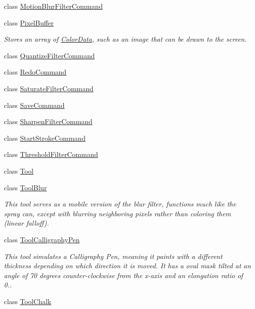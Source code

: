 \begin{DoxyCompactItemize}
class \hyperlink{classimage__tools_1_1MotionBlurFilterCommand}{Motion\+Blur\+Filter\+Command}
\item 
class \hyperlink{classimage__tools_1_1PixelBuffer}{Pixel\+Buffer}
\begin{DoxyCompactList}\small\item\em Stores an array of \hyperlink{classimage__tools_1_1ColorData}{Color\+Data}, such as an image that can be drawn to the screen. \end{DoxyCompactList}\item 
class \hyperlink{classimage__tools_1_1QuantizeFilterCommand}{Quantize\+Filter\+Command}
\item 
class \hyperlink{classimage__tools_1_1RedoCommand}{Redo\+Command}
\item 
class \hyperlink{classimage__tools_1_1SaturateFilterCommand}{Saturate\+Filter\+Command}
\item 
class \hyperlink{classimage__tools_1_1SaveCommand}{Save\+Command}
\item 
class \hyperlink{classimage__tools_1_1SharpenFilterCommand}{Sharpen\+Filter\+Command}
\item 
class \hyperlink{classimage__tools_1_1StartStrokeCommand}{Start\+Stroke\+Command}
\item 
class \hyperlink{classimage__tools_1_1ThresholdFilterCommand}{Threshold\+Filter\+Command}
\item 
class \hyperlink{classimage__tools_1_1Tool}{Tool}
\item 
class \hyperlink{classimage__tools_1_1ToolBlur}{Tool\+Blur}
\begin{DoxyCompactList}\small\item\em This tool serves as a mobile version of the blur filter, functions much like the spray can, except with blurring neighboring pixels rather than coloring them (linear falloff). \end{DoxyCompactList}\item 
class \hyperlink{classimage__tools_1_1ToolCalligraphyPen}{Tool\+Calligraphy\+Pen}
\begin{DoxyCompactList}\small\item\em This tool simulates a Calligraphy Pen, meaning it paints with a different thickness depending on which direction it is moved. It has a oval mask tilted at an angle of 70 degrees counter-\/clockwise from the x-\/axis and an elongation ratio of 0.. \end{DoxyCompactList}\item 
class \hyperlink{classimage__tools_1_1ToolChalk}{Tool\+Chalk}

\end{DoxyCompactItemize}
